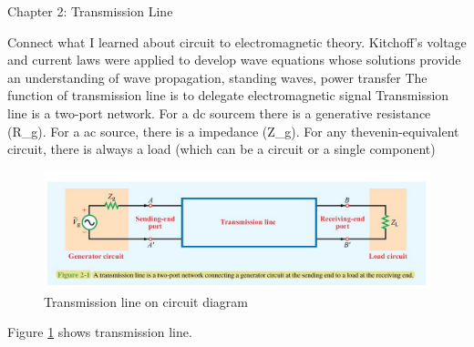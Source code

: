 \documentclass[12 pt]{article}
\begin{document}
    
    \begin{center}
        \Large Chapter 2: Transmission Line
    \end{center}

    \begin{outline}[enumerate]
    \1 Connect what I learned about circuit to electromagnetic theory.
    \1 Kitchoff's voltage and current laws were applied to develop wave equations whose solutions provide an understanding of wave propagation, standing waves, power transfer
    \1 The function of transmission line is to delegate electromagnetic signal
    \1 Transmission line is a two-port network.
      \2 For a dc sourcem there is a generative resistance (R\_g).
      \2 For a ac source, there is a impedance (Z\_g).
      \2 For any thevenin-equivalent circuit, there is always a load (which can be a circuit or a single component)    
    \end{outline}

    \begin{figure}[h!]
        \centering
        \includegraphics[width=\linewidth]{F2-1.JPG}
        \caption{Transmission line on circuit diagram}
        \label{fig:2-1}
    \end{figure}
    Figure \ref{fig:2-1} shows transmission line.
\end{document}
